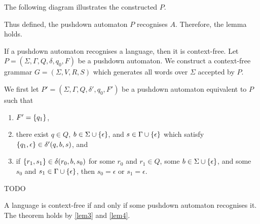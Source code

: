     The following diagram illustrates the constructed \(P\).
    \begin{figure}[!ht]
        \centering
    \end{figure}

    Thus defined, the pushdown automaton \(P\) recognises \(A\). Therefore, the
    lemma holds.
\Epr

\Blm
    \label{lem4}
    If a pushdown automaton recognises a language, then it is context-free.
\Elm
\Bpr
    Let \(P = (\Sigma, \Gamma, Q, \delta, q_0, F)\) be a pushdown automaton. We
    construct a context-free grammar \(G = (\Sigma, V, R, S)\) which generates
    all words over \(\Sigma\) accepted by \(P\).

    We first let \(P' = (\Sigma, \Gamma, Q, \delta', q_0, F')\) be a pushdown
    automaton equivalent to \(P\) such that
    \begin{enumerate}
        \item \(F' = \{q_1\}\),
        \item there exist \(q \in Q\), \(b \in \Sigma \cup \{\epsilon\}\), and
        \(s \in \Gamma \cup \{\epsilon\}\) which satisfy \(\{q_1, \epsilon\}
        \in \delta'(q, b, s)\), and
        \item if \(\{r_1, s_1\} \in \delta(r_0, b, s_0)\) for some \(r_0\) and
        \(r_1 \in Q\), some \(b \in \Sigma \cup \{\epsilon\}\), and some
        \(s_0\) and \(s_1 \in \Gamma \cup \{\epsilon\}\), then \(s_0 =
        \epsilon\) or \(s_1 = \epsilon\).
    \end{enumerate}

    TODO
\Epr

\Bth
    A language is context-free if and only if some pushdown automaton recognises
    it.
\Eth
\Bpr
    The theorem holds by \autoref{lem3} and \autoref{lem4}.
\Epr

